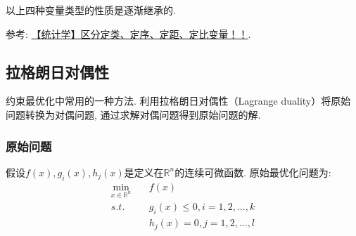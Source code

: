 以上四种变量类型的性质是逐渐继承的. 

参考: \href{https://blog.csdn.net/YYIverson/article/details/100068865}{【统计学】区分定类、定序、定距、定比变量！！}. 

\subsection{拉格朗日对偶性}
约束最优化中常用的一种方法. 利用拉格朗日对偶性（Lagrange duality）将原始问题转换为对偶问题, 通过求解对偶问题得到原始问题的解. 

\subsubsection{原始问题}假设$f(x), g_i(x), h_j(x)$是定义在$\mathbb{R}^n$的连续可微函数. 原始最优化问题为: 
\begin{align}
	\mathop{min}_{x \in \mathbb{R}^n}&\quad f(x) \nonumber \\
	s.t.&\quad g_i(x) \leqslant 0, i = 1, 2, ..., k \nonumber \\
		&\quad h_j(x) = 0, j = 1, 2, ..., l \nonumber
\end{align}

